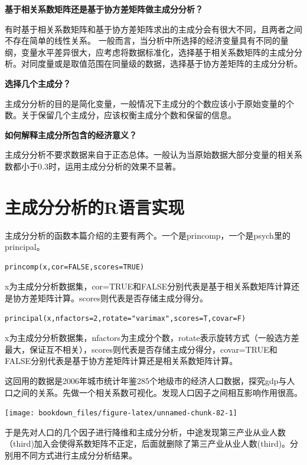 \documentclass[]{ctexbook}
\begin{document}
\textbf{基于相关系数矩阵还是基于协方差矩阵做主成分分析？}

有时基于相关系数矩阵和基于协方差矩阵求出的主成分会有很大不同，且两者之间不存在简单的线性关系。
一般而言，当分析中所选择的经济变量具有不同的量纲，变量水平差异很大，应考虑将数据标准化，选择基于相关系数矩阵的主成分分析。对同度量或是取值范围在同量级的数据，选择基于协方差矩阵的主成分分析。

\textbf{选择几个主成分？}

主成分分析的目的是简化变量，一般情况下主成分的个数应该小于原始变量的个数。关于保留几个主成分，应该权衡主成分个数和保留的信息。

\textbf{如何解释主成分所包含的经济意义？}

主成分分析不要求数据来自于正态总体。一般认为当原始数据大部分变量的相关系数都小于0.3时，运用主成分分析的效果不显著。

\hypertarget{ux4e3bux6210ux5206ux5206ux6790ux7684rux8bedux8a00ux5b9eux73b0}{%
\section{主成分分析的R语言实现}\label{ux4e3bux6210ux5206ux5206ux6790ux7684rux8bedux8a00ux5b9eux73b0}}

主成分分析的函数本篇介绍的主要有两个。一个是princomp，一个是psych里的principal。

\begin{verbatim}
princomp(x,cor=FALSE,scores=TRUE)
\end{verbatim}

x为主成分分析数据集，cor=TRUE和FALSE分别代表是基于相关系数矩阵计算还是协方差矩阵计算。scores则代表是否存储主成分得分。

\begin{verbatim}
principal(x,nfactors=2,rotate="varimax",scores=T,covar=F)
\end{verbatim}

x为主成分分析数据集，nfactors为主成分个数，rotate表示旋转方式（一般选方差最大，保证互不相关），scores则代表是否存储主成分得分，covar=TRUE和FALSE分别代表是基于协方差矩阵计算还是相关系数矩阵计算。

这回用的数据是2006年城市统计年鉴285个地级市的经济人口数据，探究gdp与人口之间的关系。先做一个相关系数可视化。发现人口因子之间相互影响作用很高。

\texttt{[image: bookdown\_files/figure-latex/unnamed-chunk-82-1]}

于是先对人口的几个因子进行降维和主成分分析，中途发现第三产业从业人数（third)加入会使得系数矩阵不正定，后面就删除了第三产业从业人数(third)。分别用不同方式进行主成分分析结果。
\end{document}
